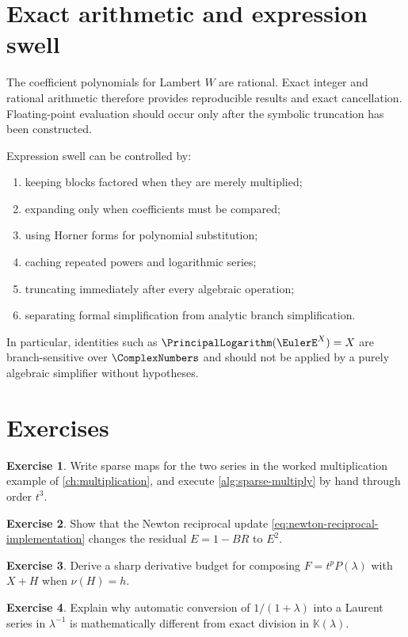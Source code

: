 \documentclass[11pt,openany]{book}
\theoremstyle{definition}
\newtheorem{exercise}{Exercise}[chapter]
\theoremstyle{plain}
\theoremstyle{remark}
\newcommand{\K}{\mathbb{K}}
\newcommand{\val}{\nu}
\begin{document}
\section{Exact arithmetic and expression swell}
The coefficient polynomials for Lambert \(W\) are rational. Exact integer and rational arithmetic therefore provides reproducible results and exact cancellation. Floating-point evaluation should occur only after the symbolic truncation has been constructed.

Expression swell can be controlled by:
\begin{enumerate}
\item keeping blocks factored when they are merely multiplied;
\item expanding only when coefficients must be compared;
\item using Horner forms for polynomial substitution;
\item caching repeated powers and logarithmic series;
\item truncating immediately after every algebraic operation;
\item separating formal simplification from analytic branch simplification.
\end{enumerate}
In particular, identities such as \(\PrincipalLogarithm(\EulerE^X)=X\) are branch-sensitive over \(\ComplexNumbers\) and should not be applied by a purely algebraic simplifier without hypotheses.

\section{Exercises}
\begin{exercise}
Write sparse maps for the two series in the worked multiplication example of \cref{ch:multiplication}, and execute \cref{alg:sparse-multiply} by hand through order \(t^3\).
\end{exercise}
\begin{exercise}
Show that the Newton reciprocal update \cref{eq:newton-reciprocal-implementation} changes the residual \(E=1-BR\) to \(E^2\).
\end{exercise}
\begin{exercise}
Derive a sharp derivative budget for composing \(F=t^pP(\lambda)\) with \(X+H\) when \(\val(H)=h\).
\end{exercise}
\begin{exercise}
Explain why automatic conversion of \(1/(1+\lambda)\) into a Laurent series in \(\lambda^{-1}\) is mathematically different from exact division in \(\K(\lambda)\).
\end{exercise}
\end{document}

